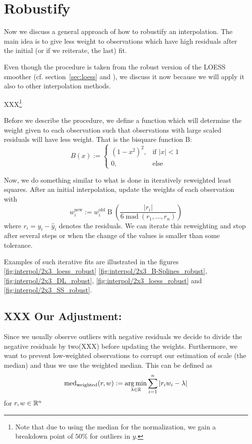 \section{Robustify}
\label{sec:loess_robustify}
Now we discuss a general approach of how to robustify an interpolation. The main idea is to give less weight to observations which have high residuals after the initial (or if we reiterate, the last) fit.

Even though the procedure is taken from the robust version of the LOESS smoother (cf. section~\ref{sec:loess} and \cite{clevelandRobustLocallyWeighted1979}), we discuss it now because we will apply it also to other interpolation methods.


XXX\footnote{Note that due to using the median for the normalization, we gain a breakdown point of $50 \%$ for outliers in $y$.}

Before we describe the procedure, we define a function which will determine the weight given to each observation such that observations with large scaled residuals will have less weight. That is the bisquare function B:
$$
	B(x):=\begin{cases}
		\left(1-x^{2}\right)^{2}, & \text{if } |x|<1 \\
		0,                        & \text{else }
	\end{cases}
$$

Now, we do something similar to what is done in iteratively reweighted least squares. After an initial interpolation, update the weights of each observation with
\begin{equation}
	w_i^\text{new}:=w_i^\text{old} \operatorname{B}\left(\frac{|r_i|}{6\operatorname{mad}\left(r_1,\dots,r_n\right)}\right)
	\label{eq:bisquare}
\end{equation}
where $r_i = y_i - \hat y_i$ denotes the residuals. We can iterate this reweighting and stop after several steps or when the change of the values is smaller than some tolerance.

Examples of such iterative fits are illustrated in the figures \ref{fig:interpol/2x3_loess_robust} \ref{fig:interpol/2x3_B-Splines_robust}, \ref{fig:interpol/2x3_DL_robust}, \ref{fig:interpol/2x3_loess_robust} and \ref{fig:interpol/2x3_SS_robust}.


\subsection{XXX Our Adjustment:} Since we usually observe outliers with negative residuals we decide to divide the negative residuals by two(XXX) before updating the weights. Furthermore, we want to prevent low-weighted observations to corrupt our estimation of scale (the median) and thus we use the weighted median. This can be defined as
$$
	\operatorname{med}_\text{weighted}(r,w) := \operatorname*{arg\, min}_{\lambda \in \mathbb{R}} \sum_{i=1}^n |r_iw_i -\lambda|
$$
for $r,w\in \mathbb{R}^n$
 

